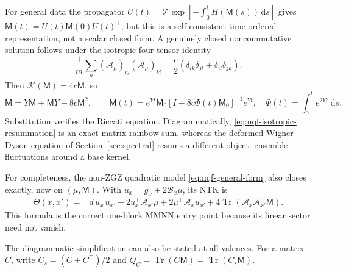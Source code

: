 \documentclass{article}
\newcommand{\Tr}{\operatorname{Tr}}
\newcommand{\dd}{\,\mathrm d}
\begin{document}
For general data the propagator
\(U(t)=\mathcal T\exp[-\int_0^tH(\mathsf M(s))\dd s]\) gives
\(\mathsf M(t)=U(t)\mathsf M(0)U(t)^\top\), but this is a self-consistent
time-ordered representation, not a scalar closed form.  A genuinely closed
noncommutative solution follows under the isotropic four-tensor identity
\begin{equation}
\frac1m\sum_\mu(\mathscr A_\mu)_{ij}(\mathscr A_\mu)_{kl}
=\frac c2(\delta_{ik}\delta_{jl}+\delta_{il}\delta_{jk}).
\label{eq:nqf-isotropy}
\end{equation}
Then \(\mathscr K(\mathsf M)=4c\mathsf M\), so
\begin{equation}
\dot{\mathsf M}=Y\mathsf M+\mathsf MY-8c\mathsf M^2,
\qquad
\mathsf M(t)=e^{Yt}\mathsf M_0
[I+8c\Phi(t)\mathsf M_0]^{-1}e^{Yt},
\quad
\Phi(t)=\int_0^te^{2Ys}\dd s.
\label{eq:nqf-isotropic-resummation}
\end{equation}
Substitution verifies the Riccati equation.  Diagrammatically,
\eqref{eq:nqf-isotropic-resummation} is an exact matrix rainbow sum, whereas
the deformed-Wigner Dyson equation of Section~\ref{sec:spectral} resums a
different object: ensemble fluctuations around a base kernel.

For completeness, the non-ZGZ quadratic model
\eqref{eq:nqf-general-form} also closes exactly, now on
\((\mu,\mathsf M)\).  With \(u_x=g_x+2\mathscr B_x\mu\), its NTK is
\begin{align}
\Theta(x,x')={}&d\,u_x^\top u_{x'}
+2u_x^\top\mathscr A_{x'}\mu
+2\mu^\top\mathscr A_xu_{x'}
+4\Tr(\mathscr A_x\mathscr A_{x'}\mathsf M).
\label{eq:nqf-general-ntk}
\end{align}
This formula is the correct one-block MMNN entry point because its linear
sector need not vanish.

The diagrammatic simplification can also be stated at all valences.  For a
matrix \(C\), write \(C_s=(C+C^\top)/2\) and
\(Q_C=\Tr(C\mathsf M)=\Tr(C_s\mathsf M)\).
\end{document}
